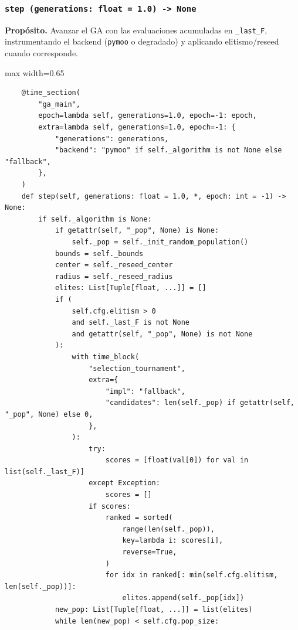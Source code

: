 \subsubsection*{\texttt{step~(generations:\ float = 1.0) -> None}}
\vfill
\textbf{Propósito.} Avanzar el GA con las evaluaciones acumuladas en \texttt{\_last\_F}, instrumentando el backend (\texttt{pymoo} o degradado) y aplicando elitismo/reseed cuando corresponde.

\begin{listing}[H]
\caption{Fragmento de \texttt{StreamingGA.step}}
\begin{adjustbox}{max width=0.65\textwidth}
\begin{minipage}{\textwidth}
\begin{verbatim}
    @time_section(
        "ga_main",
        epoch=lambda self, generations=1.0, epoch=-1: epoch,
        extra=lambda self, generations=1.0, epoch=-1: {
            "generations": generations,
            "backend": "pymoo" if self._algorithm is not None else "fallback",
        },
    )
    def step(self, generations: float = 1.0, *, epoch: int = -1) -> None:
        if self._algorithm is None:
            if getattr(self, "_pop", None) is None:
                self._pop = self._init_random_population()
            bounds = self._bounds
            center = self._reseed_center
            radius = self._reseed_radius
            elites: List[Tuple[float, ...]] = []
            if (
                self.cfg.elitism > 0
                and self._last_F is not None
                and getattr(self, "_pop", None) is not None
            ):
                with time_block(
                    "selection_tournament",
                    extra={
                        "impl": "fallback",
                        "candidates": len(self._pop) if getattr(self, "_pop", None) else 0,
                    },
                ):
                    try:
                        scores = [float(val[0]) for val in list(self._last_F)]
                    except Exception:
                        scores = []
                    if scores:
                        ranked = sorted(
                            range(len(self._pop)),
                            key=lambda i: scores[i],
                            reverse=True,
                        )
                        for idx in ranked[: min(self.cfg.elitism, len(self._pop))]:
                            elites.append(self._pop[idx])
            new_pop: List[Tuple[float, ...]] = list(elites)
            while len(new_pop) < self.cfg.pop_size:

\end{verbatim}
\end{minipage}
\end{adjustbox}
\end{listing}
